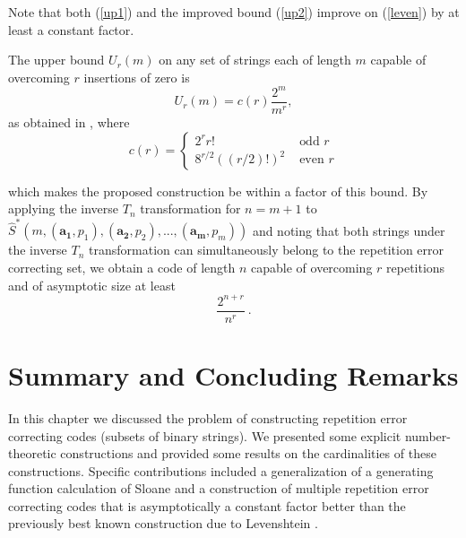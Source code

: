 Note that both (\ref{up1}) and the improved bound (\ref{up2})
improve on (\ref{leven}) by at least a constant factor.

The upper bound $U_r(m)$ on any set of strings each of length $m$
capable of overcoming $r$ insertions of zero is \[U_r(m)=c(r)
\frac{2^m}{m^r},\] as obtained in \cite{lev:66a}, where \[ c(r)
=\left\{
\begin{array}{lll} 2^r r! &
\text{ odd } r\\
8^{r/2}((r/2)!)^2&\text{ even } r\end{array} \right. \]

which makes the proposed construction be within a factor of this
bound. By applying the inverse $T_n$ transformation for $n=m+1$ to
$\hat{S}^*\left(m,(\mathbf{a_1},p_1),(\mathbf{a_2},p_2),...,(\mathbf{a_m},p_m)\right)$
and noting that both strings under the inverse $T_n$ transformation
can simultaneously belong to the repetition error correcting set, we
obtain a code of length $n$ capable of overcoming $r$ repetitions
and of asymptotic size at least
\begin{equation}\frac{2^{n+r}}{n^r}~.\end{equation}


\section{Summary and Concluding Remarks}

In this chapter we discussed the problem of constructing repetition
error correcting codes (subsets of binary strings). We presented
some explicit number-theoretic constructions and provided some
results on the cardinalities of these constructions. Specific
contributions included a generalization of a generating function
calculation of Sloane \cite{sloane:00} and a construction of
multiple repetition error correcting codes that is asymptotically a
constant factor better than the previously best known construction
due to Levenshtein \cite{lev:66a}.


